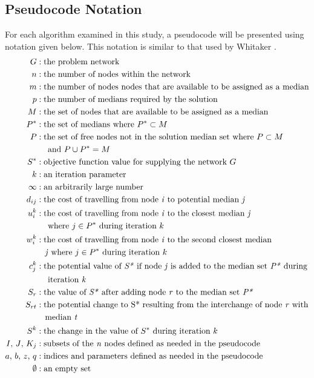 \documentclass[11pt]{article}
\begin{document}
	\subsection{Pseudocode Notation} \label{pseudocode.notation}
	For each algorithm examined in this study, a pseudocode will be presented using notation given below.  This notation is similar to that used by Whitaker \cite{WHIT83}.
	\begin{align*}
	G &: \text{the problem network}\\
	n &: \text{the number of nodes within the network}\\
	m &: \text{the number of nodes nodes that are available to be assigned as a median}\\
	p &: \text{the number of medians required by the solution}\\
	M &: \text{the set of nodes that are available to be assigned as a median}\\
	P^{*} &: \text{the set of medians where } P^{*} \subset M\\
	P &: \text{the set of free nodes not in the solution median set where } P \subset M\\
			& \quad \text{ and } P \cup P^{*} = M\\
	S^{*} &: \text{objective function value for supplying the network } G\\
	k &: \text{an iteration parameter}\\
	\infty &: \text{an arbitrarily large number}\\
	d_{ij} &: \text{the cost of travelling from node \emph{i} to potential median \emph{j}}\\
	u_{i}^{k} &: \text{the cost of travelling from node \emph{i} to the closest median \emph{j}}\\
			& \quad \text{ where } j \in P^{*} \text{ during iteration } k\\
	w_{i}^{k} &: \text{the cost of travelling from node \emph{i} to the second closest median}\\
			& \quad \text{\emph{j} where } j \in P^{*} \text{ during iteration } k\\
	c_{j}^{k} &: \text{the potential value of \emph{S*} if node \emph{j} is added to the median set \emph{P*} during}\\
			& \quad \text{ iteration \emph{k}}\\
	S_{r} &: \text{the value of \emph{S*} after adding node \emph{r} to the median set \emph{P*}}\\
	S_{rt} &: \text{the potential change to S* resulting from the interchange of node \emph{r} with}\\
		& \quad \text{median \emph{t}}\\
	S^k &: \text{the change in the value of $S^*$ during iteration $k$}\\
	I \text{, } J \text{, } K_{j} &: \text{subsets of the \emph{n} nodes defined as needed in the pseudocode}\\
	a \text{, } b \text{, } z \text{, } q &: \text{indices and parameters defined as needed in the pseudocode}\\
	\emptyset &: \text{an empty set}	
	\end{align*}
	
\end{document}

